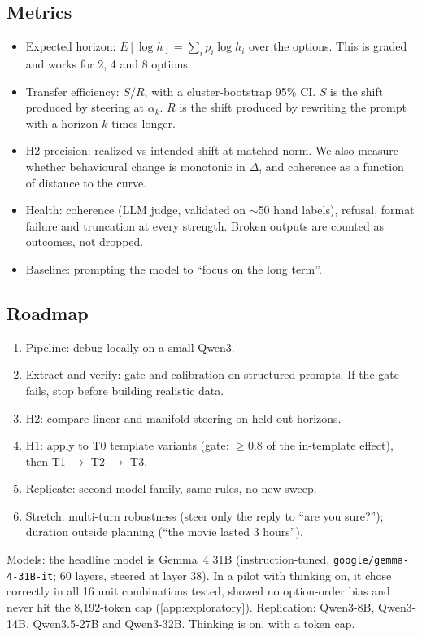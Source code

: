 \documentclass[midterm]{sparreport}
\begin{document}
\subsection{Metrics}
\label{app:metrics}

\begin{itemize}
  \item Expected horizon: $E[\log h] = \sum_i p_i \log h_i$ over the options. This is graded and works for 2, 4 and 8 options.
  \item Transfer efficiency: $S / R$, with a cluster-bootstrap 95\% CI. $S$ is the shift produced by steering at $\alpha_k$. $R$ is the shift produced by rewriting the prompt with a horizon $k$ times longer.
  \item H2 precision: realized vs intended shift at matched norm. We also measure whether behavioural change is monotonic in $\Delta$, and coherence as a function of distance to the curve.
  \item Health: coherence (LLM judge, validated on $\sim$50 hand labels), refusal, format failure and truncation at every strength. Broken outputs are counted as outcomes, not dropped.
  \item Baseline: prompting the model to ``focus on the long term''.
\end{itemize}

\subsection{Roadmap}
\label{app:roadmap}

\begin{enumerate}
  \item Pipeline: debug locally on a small Qwen3.
  \item Extract and verify: gate and calibration on structured prompts. If the gate fails, stop before building realistic data.
  \item H2: compare linear and manifold steering on held-out horizons.
  \item H1: apply to T0 template variants (gate: $\geq 0.8$ of the in-template effect), then T1 $\rightarrow$ T2 $\rightarrow$ T3.
  \item Replicate: second model family, same rules, no new sweep.
  \item Stretch: multi-turn robustness (steer only the reply to ``are you sure?''); duration outside planning (``the movie lasted 3 hours'').
\end{enumerate}

Models: the headline model is Gemma~4 31B (instruction-tuned, \texttt{google/gemma-4-31B-it}; 60 layers, steered at layer 38). In a pilot with thinking on, it chose correctly in all 16 unit combinations tested, showed no option-order bias and never hit the 8,192-token cap (\cref{app:exploratory}). Replication: Qwen3-8B, Qwen3-14B, Qwen3.5-27B and Qwen3-32B. Thinking is on, with a token cap.
\end{document}
